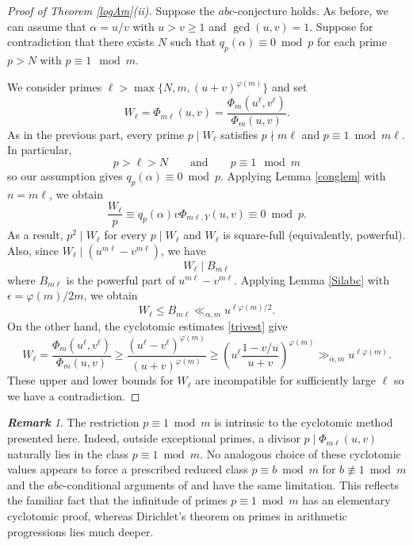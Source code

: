 \documentclass[12pt,reqno]{amsart}
\theoremstyle{remark}
\newtheorem{remark}[theorem]{\bf Remark}
\begin{document}
\begin{proof}[Proof of Theorem \ref{logAm}(ii)]
Suppose the $abc$-conjecture holds. 
As before, we can assume that $\alpha=u/v$ with $u>v\geq 1$ and $\gcd(u,v)=1$. 
Suppose for contradiction that there exists $N$ such that $q_p(\alpha)\equiv 0\bmod p$ for each prime $p>N$ with $p\equiv 1\mod m$. 
\medskip

We consider primes $\ell>\max\{N,m,(u+v)^{\varphi(m)}\}$ and set 
\[W_\ell=\Phi_{m\ell}(u,v)=\frac{\Phi_m(u^\ell,v^\ell)}{\Phi_m(u,v)}.\] 
As in the previous part, every prime $p\mid W_\ell$ satisfies $p\nmid m\ell$ and $p\equiv 1\bmod m\ell$. In particular, 
\[p>\ell>N\qquad\text{and}\qquad p\equiv 1\mod m\]
so our assumption gives $q_p(\alpha)\equiv 0\bmod p$. Applying Lemma \ref{conglem} with $n=m\ell$, we obtain
\[\frac{W_\ell}{p}\equiv q_p(\alpha)v\Phi_{m\ell,Y}(u,v)\equiv 0\bmod p.\]
As a result, $p^2\mid W_\ell$ for every $p\mid W_\ell$ and $W_\ell$ is square-full (equivalently, powerful). 
Also, since $W_\ell\mid \left(u^{m\ell}-v^{m\ell}\right)$, we have 
\[W_\ell\mid B_{m\ell}\]
where $B_{m\ell}$ is the powerful part of $u^{m\ell}-v^{m\ell}$. Applying Lemma \ref{Silabc} with $\epsilon=\varphi(m)/2m$, we obtain
\[W_\ell\leq B_{m\ell}\ll_{\alpha,m}u^{\ell\varphi(m)/2}.\]
On the other hand, the cyclotomic estimates \eqref{trivest} give
\[W_\ell=\frac{\Phi_m(u^\ell,v^\ell)}{\Phi_m(u,v)}
\geq \frac{(u^\ell-v^\ell)^{\varphi(m)}}{(u+v)^{\varphi(m)}}
\geq \left(u^\ell\frac{1-v/u}{u+v}\right)^{\varphi(m)}
\gg_{\alpha,m} u^{\ell\varphi(m)}.\]
These upper and lower bounds for $W_\ell$ are incompatible for sufficiently large $\ell$ so we have a contradiction.
\end{proof}
\begin{remark}
The restriction $p\equiv 1\bmod m$ is intrinsic to the cyclotomic method presented here. 
Indeed, outside exceptional primes, a divisor $p\mid\Phi_{m\ell}(u,v)$ naturally lies in the class $p\equiv 1 \bmod m$. No analogous choice of these cyclotomic values appears to force a prescribed reduced class $p\equiv b\bmod m$ for $b\not\equiv 1\bmod m$ and the $abc$-conditional arguments of \cite{GRM13} and \cite{D19} have the same limitation. This reflects the familiar fact that the infinitude of primes $p\equiv 1\bmod m$ has an elementary cyclotomic proof, whereas Dirichlet's theorem on primes in arithmetic progressions lies much deeper.
\end{remark}
\end{document}

